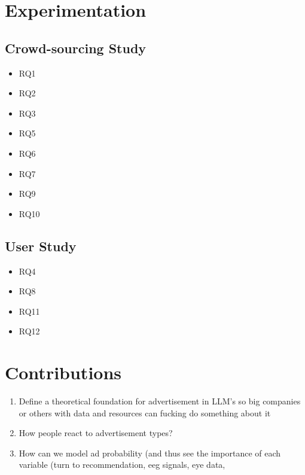 \documentclass{article}
\begin{document}
\section{Experimentation}

\subsection{Crowd-sourcing Study}

    \begin{itemize}
        \item RQ1
        \item RQ2
        \item RQ3
        \item RQ5
        \item RQ6
        \item RQ7
        \item RQ9
        \item RQ10
    \end{itemize}
    
\subsection{User Study}

    \begin{itemize}
        \item RQ4
        \item RQ8
        \item RQ11
        \item RQ12
    \end{itemize}
    
\section{Contributions}

\begin{enumerate}
    \item Define a theoretical foundation for advertisement in LLM's so big companies or others with data and resources can fucking do something about it 
    \item How people react to advertisement types?
    \item How can we model ad probability (and thus see the importance of each variable (turn to recommendation, eeg signals, eye data,
\end{enumerate}

\end{document}
